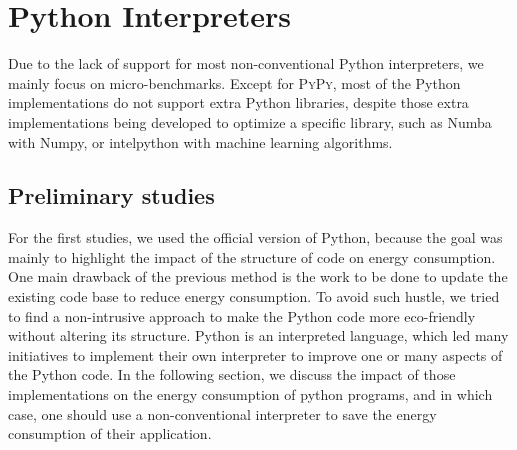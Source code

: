 \section{Python Interpreters}\label{sec:pythoninterpreters}
Due to the lack of support for most non-conventional Python interpreters, we mainly focus on micro-benchmarks.
Except for \textsc{PyPy}, most of the Python implementations do not support extra Python libraries, despite those extra implementations being developed to optimize a specific library, such as \textsf{Numba} with \textsf{Numpy}, or \textsf{intelpython} with machine learning algorithms.


\subsection{Preliminary studies}
For the first studies, we used the official version of Python, because the goal was mainly to highlight the impact of the structure of code on energy consumption.
One main drawback of the previous method is the work to be done to update the existing code base to reduce  energy consumption.
To avoid such hustle, we tried to find a non-intrusive approach to make the Python code more eco-friendly without altering its structure.
Python is an interpreted language, which led many initiatives to implement their own interpreter to improve one or many aspects of the Python code.
In the following section, we discuss the impact of those implementations on the energy consumption of python programs, and in which case, one should use a non-conventional interpreter to save the energy consumption of their application.

